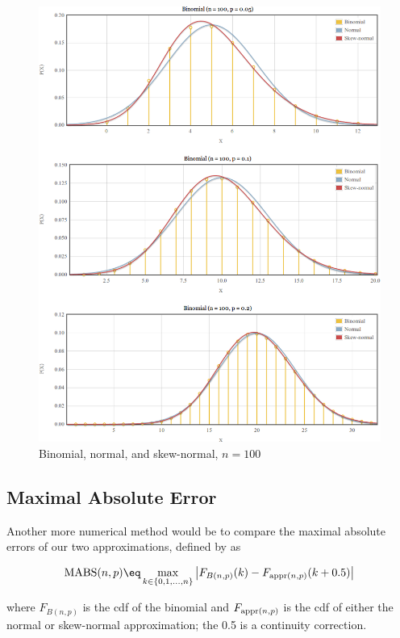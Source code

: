 \documentclass{article}
\begin{document}
\begin{figure}
  \centering
  \includegraphics[width=\textwidth]{../graphs/images/comparison-n100.png}
  \caption{Binomial, normal, and skew-normal, $n=100$}
  \label{fig:comparison-n100}
\end{figure}

\subsection{Maximal Absolute Error}

Another more numerical method would be to compare the maximal absolute errors
of our two approximations, defined by \citet{mabs} as

\begin{equation}
  \textnormal{MABS}(n, p) \eq \max_{k \in \{0, 1,...,n\}} \left| F_{B(n,p)} (k) -  F_{\textnormal{appr}(n,p)}(k + 0.5) \right|
\end{equation}

where $F_{B(n,p)}$ is the cdf of the binomial and $F_{\textnormal{appr}(n,p)}$
is the cdf of either the normal or skew-normal approximation; the 0.5 is a
continuity correction.
\end{document}
